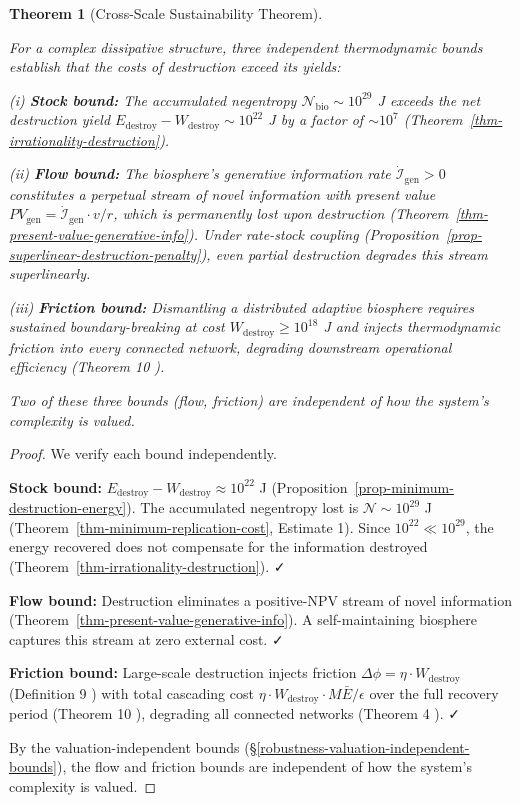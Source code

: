 \documentclass[11pt]{article}
\theoremstyle{plain}
\newtheorem{theorem}{Theorem}
\theoremstyle{definition}
\theoremstyle{remark}
\begin{document}
\begin{theorem}[Cross-Scale Sustainability Theorem]
\label{thm-negentropy-defense}

For a complex dissipative structure, three independent thermodynamic bounds establish that the costs of destruction exceed its yields:

(i) \textbf{Stock bound:} The accumulated negentropy $\mathcal{N}_{\text{bio}} \sim 10^{29}$ J exceeds the net destruction yield $E_{\text{destroy}} - W_{\text{destroy}} \sim 10^{22}$ J by a factor of $\sim 10^7$ (Theorem~\ref{thm-irrationality-destruction}).

(ii) \textbf{Flow bound:} The biosphere's generative information rate $\dot{\mathcal{I}}_{\text{gen}} > 0$ constitutes a perpetual stream of novel information with present value $PV_{\text{gen}} = \dot{\mathcal{I}}_{\text{gen}} \cdot v / r$, which is permanently lost upon destruction (Theorem~\ref{thm-present-value-generative-info}). Under rate-stock coupling (Proposition~\ref{prop-superlinear-destruction-penalty}), even partial destruction degrades this stream superlinearly.

(iii) \textbf{Friction bound:} Dismantling a distributed adaptive biosphere requires sustained boundary-breaking at cost $W_{\text{destroy}} \geq 10^{18}$ J and injects thermodynamic friction into every connected network, degrading downstream operational efficiency (Theorem 10 \citep{TC-IV}).

Two of these three bounds (flow, friction) are independent of how the system's complexity is valued.
\end{theorem}

\begin{proof}
We verify each bound independently.

\textbf{Stock bound:} $E_{\text{destroy}} - W_{\text{destroy}} \approx 10^{22}$ J (Proposition~\ref{prop-minimum-destruction-energy}). The accumulated negentropy lost is $\mathcal{N} \sim 10^{29}$ J (Theorem~\ref{thm-minimum-replication-cost}, Estimate 1). Since $10^{22} \ll 10^{29}$, the energy recovered does not compensate for the information destroyed (Theorem~\ref{thm-irrationality-destruction}). ✓

\textbf{Flow bound:} Destruction eliminates a positive-NPV stream of novel information (Theorem~\ref{thm-present-value-generative-info}). A self-maintaining biosphere captures this stream at zero external cost. ✓

\textbf{Friction bound:} Large-scale destruction injects friction $\Delta\phi = \eta \cdot W_{\text{destroy}}$ (Definition 9 \citep{TC-IV}) with total cascading cost $\eta \cdot W_{\text{destroy}} \cdot M \bar{E} / \epsilon$ over the full recovery period (Theorem 10 \citep{TC-IV}), degrading all connected networks (Theorem 4 \citep{TC-V}). ✓

By the valuation-independent bounds (§\ref{robustness-valuation-independent-bounds}), the flow and friction bounds are independent of how the system's complexity is valued.
\end{proof}
\end{document}
